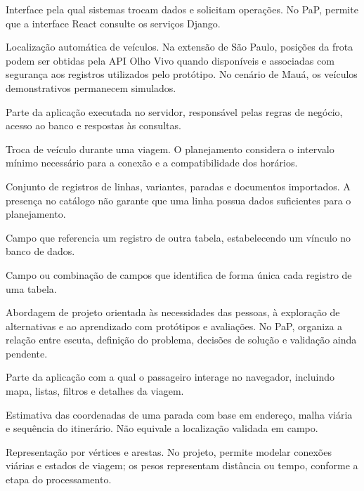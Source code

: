 \documentclass[12pt,oneside,a4paper,brazil,chapter=TITLE]{abntex2}
\begin{document}
\begin{description}[style=nextline,leftmargin=0pt,labelwidth=0pt,font=\bfseries,itemsep=0.5\baselineskip]
\item[API (Application Programming Interface)] Interface pela qual sistemas trocam dados e solicitam operações. No PaP, permite que a interface React consulte os serviços Django.
\item[AVL (Automatic Vehicle Location)] Localização automática de veículos. Na extensão de São Paulo, posições da frota podem ser obtidas pela API Olho Vivo quando disponíveis e associadas com segurança aos registros utilizados pelo protótipo. No cenário de Mauá, os veículos demonstrativos permanecem simulados.
\item[Backend] Parte da aplicação executada no servidor, responsável pelas regras de negócio, acesso ao banco e respostas às consultas.
\item[Baldeação] Troca de veículo durante uma viagem. O planejamento considera o intervalo mínimo necessário para a conexão e a compatibilidade dos horários.
\item[Catálogo] Conjunto de registros de linhas, variantes, paradas e documentos importados. A presença no catálogo não garante que uma linha possua dados suficientes para o planejamento.
\item[Chave estrangeira (FK, Foreign Key)] Campo que referencia um registro de outra tabela, estabelecendo um vínculo no banco de dados.
\item[Chave primária (PK, Primary Key)] Campo ou combinação de campos que identifica de forma única cada registro de uma tabela.
\item[Design Thinking] Abordagem de projeto orientada às necessidades das pessoas, à exploração de alternativas e ao aprendizado com protótipos e avaliações. No PaP, organiza a relação entre escuta, definição do problema, decisões de solução e validação ainda pendente.
\item[Frontend] Parte da aplicação com a qual o passageiro interage no navegador, incluindo mapa, listas, filtros e detalhes da viagem.
\item[Geolocalização aproximada] Estimativa das coordenadas de uma parada com base em endereço, malha viária e sequência do itinerário. Não equivale a localização validada em campo.
\item[Grafo] Representação por vértices e arestas. No projeto, permite modelar conexões viárias e estados de viagem; os pesos representam distância ou tempo, conforme a etapa do processamento.

\end{description}
\end{document}
